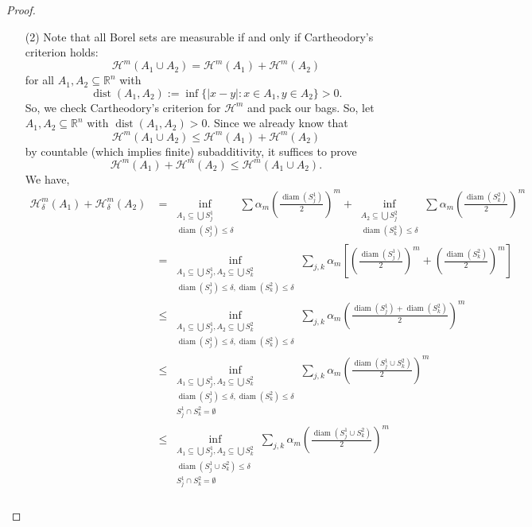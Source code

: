 \documentclass[10pt]{article}
\theoremstyle{plain}
\DeclareMathOperator{\diam}{diam}
\DeclareMathOperator{\dist}{dist}
\begin{document}
\begin{proof}
\begin{itemize}
			\item[(2)] Note that all Borel sets are measurable if and only if Cartheodory's criterion holds:  $$\mathcal{H}^m(A_1 \cup A_2) = \mathcal{H}^m(A_1) + \mathcal{H}^m(A_2)$$ for all $A_1, A_2 \subseteq \mathbb{R}^n$ with $$\dist(A_1, A_2) := \inf\{|x - y| : x \in A_1, y \in A_2\} > 0.$$ So, we check Cartheodory's criterion for $\mathcal{H}^m$ and pack our bags. So, let $A_1, A_2 \subseteq \mathbb{R}^n$ with $\dist(A_1, A_2) > 0$. Since we already know that $$\mathcal{H}^m(A_1 \cup A_2) \leq \mathcal{H}^m(A_1) + \mathcal{H}^m(A_2)$$ by countable (which implies finite) subadditivity, it suffices to prove $$\mathcal{H}^m(A_1) + \mathcal{H}^m(A_2) \leq \mathcal{H}^m(A_1 \cup A_2).$$ We have,
				\begin{align*}
					\mathcal{H}_\delta^m(A_1) + \mathcal{H}_\delta^m(A_2) &= \inf_{\substack{A_1 \subseteq \bigcup S_j^1 \\ \diam(S_j^1) \leq \delta}} \sum \alpha_m \left(\frac{\diam(S_j^1)}{2}\right)^m + \inf_{\substack{A_2 \subseteq \bigcup S_j^2 \\ \diam(S_k^2) \leq \delta}} \sum \alpha_m \left(\frac{\diam(S_k^2)}{2}\right)^m \\
					&= \inf_{\substack{A_1 \subseteq \bigcup S_j^1, A_2 \subseteq \bigcup S_k^2 \\ \diam(S_j^1) \leq \delta, \diam(S_k^2) \leq \delta}} \sum_{j, k} \alpha_m \left[\left(\frac{\diam(S_j^1)}{2}\right)^m + \left(\frac{\diam(S_k^2)}{2}\right)^m\right] \\
					&\leq \inf_{\substack{A_1 \subseteq \bigcup S_j^1, A_2 \subseteq \bigcup S_k^2 \\ \diam(S_j^1) \leq \delta, \diam(S_k^2) \leq \delta}} \sum_{j, k} \alpha_m  \left(\frac{\diam(S_j^1) + \diam(S_k^2)}{2}\right)^m \\
					&\leq \inf_{\substack{A_1 \subseteq \bigcup S_j^1, A_2 \subseteq \bigcup S_k^2 \\ \diam(S_j^1) \leq \delta, \diam(S_k^2) \leq \delta  \\ S_j^1 \cap S_k^2 = \emptyset}} \sum_{j, k} \alpha_m  \left(\frac{\diam(S_j^1 \cup S_k^2)}{2}\right)^m \\
					&\leq \inf_{\substack{A_1 \subseteq \bigcup S_j^1, A_2 \subseteq \bigcup S_k^2 \\ \boxed{\diam(S_j^1 \cup S_k^2) \leq \delta }  \\ S_j^1 \cap S_k^2 = \emptyset}} \sum_{j, k} \alpha_m  \left(\frac{\diam(S_j^1 \cup S_k^2)}{2}\right)^m \\
				\end{align*}

\end{itemize}
\end{proof}
\end{document}
